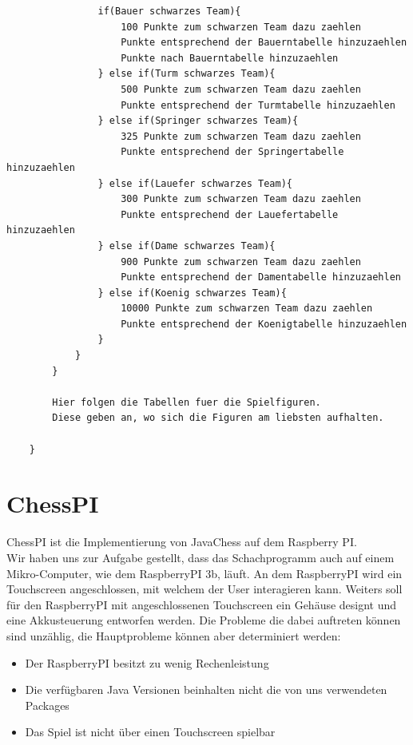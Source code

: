 \documentclass[12pt,a4paper]{article}
\begin{document}
{\begin{lstlisting}
				if(Bauer schwarzes Team){
					100 Punkte zum schwarzen Team dazu zaehlen
					Punkte entsprechend der Bauerntabelle hinzuzaehlen
					Punkte nach Bauerntabelle hinzuzaehlen
				} else if(Turm schwarzes Team){
					500 Punkte zum schwarzen Team dazu zaehlen
					Punkte entsprechend der Turmtabelle hinzuzaehlen
				} else if(Springer schwarzes Team){
					325 Punkte zum schwarzen Team dazu zaehlen
					Punkte entsprechend der Springertabelle hinzuzaehlen
				} else if(Lauefer schwarzes Team){
					300 Punkte zum schwarzen Team dazu zaehlen
					Punkte entsprechend der Lauefertabelle hinzuzaehlen
				} else if(Dame schwarzes Team){
					900 Punkte zum schwarzen Team dazu zaehlen
					Punkte entsprechend der Damentabelle hinzuzaehlen
				} else if(Koenig schwarzes Team){
					10000 Punkte zum schwarzen Team dazu zaehlen
					Punkte entsprechend der Koenigtabelle hinzuzaehlen
				}
			}
		}
		
		Hier folgen die Tabellen fuer die Spielfiguren.
		Diese geben an, wo sich die Figuren am liebsten aufhalten.
		
	}	
\end{lstlisting}

\clearpage\vfill\newpage{}
\section{ChessPI}
\label{SEC:chesspi}

ChessPI ist die Implementierung von JavaChess auf dem Raspberry PI. \\
Wir haben uns zur Aufgabe gestellt, dass das Schachprogramm auch auf einem Mikro-Computer, wie dem RaspberryPI 3b, läuft. An dem RaspberryPI wird ein Touchscreen angeschlossen, mit welchem der User interagieren kann. Weiters soll für den RaspberryPI mit angeschlossenen Touchscreen ein Gehäuse designt und eine Akkusteuerung entworfen werden. 
Die Probleme die dabei auftreten können sind unzählig, die Hauptprobleme können aber determiniert werden:
\begin{itemize}
	\item{Der RaspberryPI besitzt zu wenig Rechenleistung}
	\item{Die verfügbaren Java Versionen beinhalten nicht die von uns verwendeten Packages}
	\item{Das Spiel ist nicht über einen Touchscreen spielbar}
\end{itemize}

}
\end{document}
